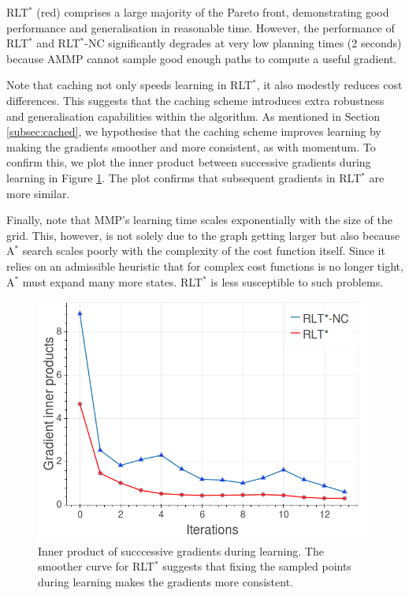 \documentclass[a4paper,11pt]{report}
\begin{document}
 RLT$^*$ (red) comprises a large majority of the Pareto front, demonstrating good performance and generalisation in reasonable time.  However, the performance of RLT$^*$ and RLT$^*$-NC significantly degrades at very low planning times (2 seconds) because AMMP cannot sample good enough paths to compute a useful gradient.
 
 Note that caching not only speeds learning in RLT$^*$, it also modestly reduces cost differences. This suggests that the caching scheme introduces extra robustness and generalisation capabilities within the algorithm.  As mentioned in Section \ref{subsec:cached}, we hypothesise that the caching scheme improves learning by making the gradients smoother and more consistent, as with momentum. To confirm this, we plot the inner product between successive gradients during learning in Figure \ref{fig:in_prod_grad}. The plot confirms that subsequent gradients in RLT$^*$ are more similar.
 
 Finally, note that MMP's learning time scales exponentially with the size of the grid. This, however, is not solely due to the graph getting larger but also because A$^*$ search scales poorly with the complexity of the cost function itself. Since it relies on an admissible heuristic that for complex cost functions is no longer tight, A$^*$ must expand many more states.  RLT$^*$ is less susceptible to such problems.

 	\begin{figure}[tbh]
	\centering
    \includegraphics[scale=0.21]{figures/momentum.png}
    \caption{Inner product of succcessive gradients during learning. The smoother curve for RLT$^*$ suggests that fixing the sampled points during learning makes the gradients more consistent. }
    \vspace{-2mm}
  \label{fig:in_prod_grad}
  \end{figure}
\end{document}
